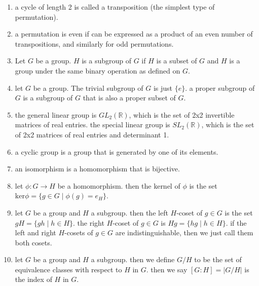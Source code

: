 \begin{enumerate}
	\item a cycle of length 2 is called a transposition (the simplest type of permutation). 
	\item a permutation is even if can be expressed as a product of an even number of transpositions, and similarly for odd permutations. 
	\item Let $G$ be a group. $H$ is a subgroup of $G$ if $H$ is a subset of $G$ and $H$ is a group under the same binary operation as defined on $G$. 
	\item let $G$ be a group. The trivial subgroup of $G$ is just $\{e\}$. a proper subgroup of $G$ is a subgroup of $G$ that is also a proper subset of $G$. 
	\item the general linear group is $GL_2(\mathbb{R})$, which is the set of 2x2 invertible matrices of real entries. the special linear group is $SL_2(\mathbb{R})$, which is the set of 2x2 matrices of real entries and determinant 1. 
	\item a cyclic group is a group that is generated by one of its elements. 
	\item an isomorphism is a homomorphism that is bijective. 
	\item let $\phi: G \to H$ be a homomorphism. then the kernel of $\phi$ is the set $\textrm{ker}\phi = \{g \in G \mid \phi(g) = e_H\}$. 
	\item let $G$ be a group and $H$ a subgroup. then the left $H$-coset of $g \in G$ is the set $gH = \{gh \mid h \in H\}$. the right $H$-coset of $g \in G$ is $Hg = \{hg \mid h \in H\}$. if the left and right $H$-cosets of $g \in G$ are indistinguishable, then we just call them both cosets. 
	\item let $G$ be a group and $H$ a subgroup. then we define $G/H$ to be the set of equivalence classes with respect to $H$ in $G$. then we say $[G:H] = |G/H|$ is the index of $H$ in $G$. 
\end{enumerate}

